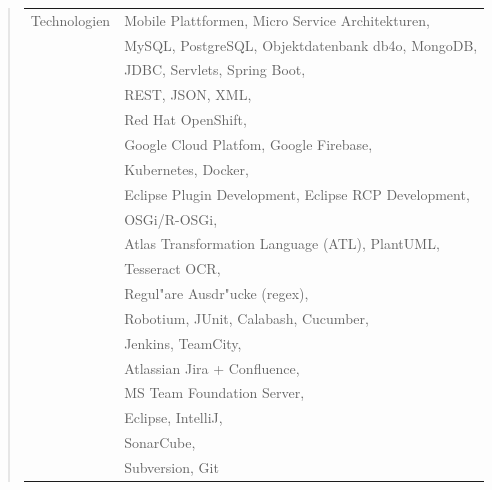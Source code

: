 \fi
%
\ifshowKenntnisseTech
\begin{quote}
	\begin{tabular}{p{4cm}l}
		Technologien&Mobile Plattformen, Micro Service Architekturen,\\
		&MySQL, PostgreSQL, Objektdatenbank db4o, MongoDB,\\
		&JDBC, Servlets, Spring Boot,\\
		&REST, JSON, XML,\\
		&Red Hat OpenShift,\\
		&Google Cloud Platfom, Google Firebase,\\
		&Kubernetes, Docker,\\
		&Eclipse Plugin Development, Eclipse RCP Development,\\
		&OSGi/R-OSGi,\\
		&Atlas Transformation Language (ATL), PlantUML,\\
		&Tesseract OCR,\\
		&Regul"are Ausdr"ucke (regex),\\
		&Robotium, JUnit, Calabash, Cucumber,\\
		&Jenkins, TeamCity,\\
		&Atlassian Jira + Confluence,\\
		&MS Team Foundation Server,\\
		&Eclipse, IntelliJ,\\
		&SonarCube,\\
		&Subversion, Git 
	\end{tabular}
\end{quote}